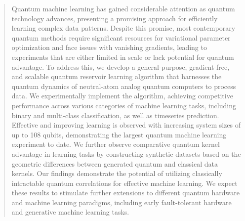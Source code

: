 \documentclass[english,floatfix,twocolumn,showpacs, aps, prx, reprint, superscriptaddress, longbibliography]{revtex4-2}
\begin{document}

\begin{abstract}

Quantum machine learning has gained considerable attention as quantum technology advances, presenting a promising approach for efficiently learning complex data patterns. Despite this promise, most contemporary quantum methods require significant resources for variational parameter optimization and face issues with vanishing gradients, leading to experiments that are either limited in scale or lack potential for quantum advantage. To address this, we develop a general-purpose, gradient-free, and scalable quantum reservoir learning algorithm that harnesses the quantum dynamics of neutral-atom analog quantum computers to process data. We experimentally implement the algorithm, achieving competitive performance across various categories of machine learning tasks, including binary and multi-class classification, as well as timeseries prediction. Effective and improving learning is observed with increasing system sizes of up to 108 qubits, demonstrating the largest quantum machine learning experiment to date. We further observe comparative quantum kernel advantage in learning tasks by constructing synthetic datasets based on the geometric differences between generated quantum and classical data kernels. Our findings demonstrate the potential of utilizing classically intractable quantum correlations for effective machine learning. We expect these results to stimulate further extensions to different quantum hardware and machine learning paradigms, including early fault-tolerant hardware and generative machine learning tasks.

\end{abstract}

\maketitle
\end{document}
